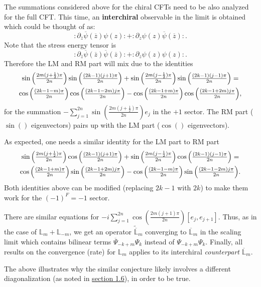 \documentclass[twoside,11pt,titlepage]{amsart}
\renewcommand{\=}[1]{\stackrel{#1}{=}} %
\theoremstyle{definition}
\theoremstyle{remark}
\begin{document}
\hfill \break
The summations considered above for the chiral CFTs need to be also analyzed for the full CFT. This time, an \textbf{interchiral} observable in the limit is obtained which could be thought of as:
$$\colon \partial_{\overline{z}}\overline{\psi}(\overline{z}) \psi(z) \colon+\colon \partial_z\psi(z) \overline{\psi}(\overline{z}) \colon.$$
Note that the stress energy tensor is 
$$\colon \partial_{\overline{z}}\overline{\psi}(\overline{z}) \overline{\psi}(\overline{z}) \colon+\colon \partial_z\psi(z) \psi(z) \colon.$$
Therefore the LM and RM part will mix due to the identities
\begin{gather*}
\scalebox{0.98}{$\sin\Big(\frac{2m(j+\frac{1}{2})\pi}{2n}\Big)\sin \Big(\frac{(2k-1)(j+1)\pi}{2n}\Big)+\sin\Big(\frac{2m(j-\frac{1}{2})\pi}{2n}\Big)\sin\Big(\frac{(2k-1)(j-1)\pi}{2n} \Big)=$} \\
\scalebox{0.98}{$\cos \Big(\frac{(2k-1-m)\pi}{2n}\Big)\cos \Big(\frac{(2k-1-2m)j\pi}{2n} \Big)-\cos \Big(\frac{(2k-1+m)\pi}{2n}\Big)\cos \Big(\frac{(2k-1+2m)j\pi}{2n} \Big),$}   
\end{gather*}
for the summation $-\sum_{j=1}^{2n} \sin(\frac{2m(j+\frac{1}{2})\pi}{2n})e_j$ in the $+1$ sector. The RM part ($\sin()$ eigenvectors) pairs up with the LM part ($\cos()$ eigenvectors).
 
As expected, one needs a similar identity for the LM part to RM part
\begin{gather*}
\scalebox{0.98}{$
\sin\Big(\frac{2m(j+\frac{1}{2})\pi}{2n}\Big)\cos \Big(\frac{(2k-1)(j+1)\pi}{2n}\Big)+\sin\Big(\frac{2m(j-\frac{1}{2})\pi}{2n}\Big)\cos\Big(\frac{(2k-1)(j-1)\pi}{2n} \Big)=
$} \\
\scalebox{0.98}{$\cos \Big(\frac{(2k-1+m)\pi}{2n}\Big)\sin \Big(\frac{(2k-1+2m)j\pi}{2n} \Big)-\cos \Big(\frac{(2k-1-m)\pi}{2n}\Big)\sin \Big(\frac{(2k-1-2m)j\pi}{2n} \Big).$}
\end{gather*}
Both identities above can be modified (replacing $2k-1$ with $2k$) to make them work for the $(-1)^F=-1$ sector.

There are similar equations for $-i\sum_{j=1}^{2n} \cos(\frac{2m(j+1)\pi}{2n})[e_j,e_{j+1}]$. Thus, as in the case of $\mathbb{L}_m+\mathbb{L}_{-m}$, we get an operator $\widetilde{\overline{\mathbb{L}}}_m$ converging to $\overline{\mathbb{L}}_m$ in the scaling limit which contains bilinear terms $\overline{\Psi}_{-k+m}\Psi_k$ instead of $\Psi_{-k+m}\Psi_k$. Finally, all results on the convergence (rate) for $\mathbb{L}_m$ applies to its interchiral \textit{counterpart} $\overline{\mathbb{L}}_m$.

The above illustrates why the similar conjecture \cite[(4.24) and (4.25)]{koo1994representations} likely involves a different diagonalization (as noted in \hyperref[1.6]{section 1.6}), in order to be true.
\end{document}
